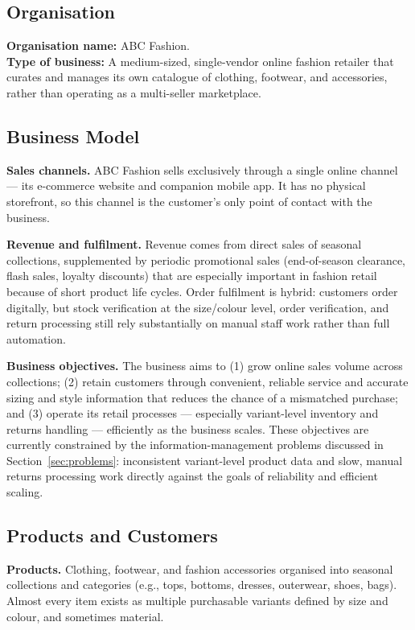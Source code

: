 \documentclass[11pt,a4paper,oneside]{extreport}
\begin{document}
\subsection{Organisation}
\textbf{Organisation name:} ABC Fashion.\\
\textbf{Type of business:} A medium-sized, single-vendor online fashion retailer that curates and manages its own catalogue of clothing, footwear, and accessories, rather than operating as a multi-seller marketplace.

\subsection{Business Model}
\textbf{Sales channels.} ABC Fashion sells exclusively through a single online channel --- its e-commerce website and companion mobile app. It has no physical storefront, so this channel is the customer's only point of contact with the business.

\textbf{Revenue and fulfilment.} Revenue comes from direct sales of seasonal collections, supplemented by periodic promotional sales (end-of-season clearance, flash sales, loyalty discounts) that are especially important in fashion retail because of short product life cycles. Order fulfilment is hybrid: customers order digitally, but stock verification at the size/colour level, order verification, and return processing still rely substantially on manual staff work rather than full automation.

\textbf{Business objectives.} The business aims to (1) grow online sales volume across collections; (2) retain customers through convenient, reliable service and accurate sizing and style information that reduces the chance of a mismatched purchase; and (3) operate its retail processes --- especially variant-level inventory and returns handling --- efficiently as the business scales. These objectives are currently constrained by the information-management problems discussed in Section~\ref{sec:problems}: inconsistent variant-level product data and slow, manual returns processing work directly against the goals of reliability and efficient scaling.

\subsection{Products and Customers}
\textbf{Products.} Clothing, footwear, and fashion accessories organised into seasonal collections and categories (e.g., tops, bottoms, dresses, outerwear, shoes, bags). Almost every item exists as multiple purchasable variants defined by size and colour, and sometimes material.
\end{document}
